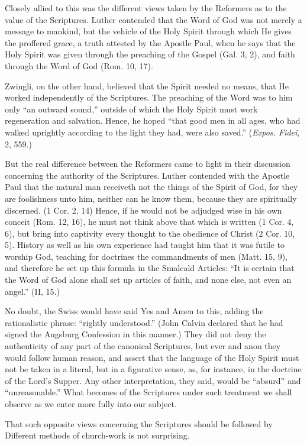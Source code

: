 \documentclass[
]{book}
\begin{document}
Closely allied to this was the different views taken by the Reformers as to the value of the Scriptures. Luther contended that the Word of God was not merely a message to mankind, but the vehicle of the Holy Spirit through which He gives the proffered grace, a truth attested by the Apostle Paul, when he says that the Holy Spirit was given through the preaching of the Gospel (Gal. 3, 2), and faith through the Word of God (Rom. 10, 17).

Zwingli, on the other hand, believed that the Spirit needed no means, that He worked independently of the Scriptures. The preaching of the Word was to him only ``an outward sound,'' outside of which the Holy Spirit must work regeneration and salvation. Hence, he hoped ``that good men in all ages, who had walked uprightly according to the light they had, were also saved.'' (\emph{Expos. Fidei}, 2, 559.)

But the real difference between the Reformers came to light in their discussion concerning the authority of the Scriptures. Luther contended with the Apostle Paul that the natural man receiveth not the things of the Spirit of God, for they are foolishness unto him, neither can he know them, because they are spiritually discerned. (1 Cor. 2, 14) Hence, if he would not be adjudged wise in his own conceit (Rom. 12, 16), he must not think above that which is written (1 Cor. 4, 6), but bring into captivity every thought to the obedience of Christ (2 Cor. 10, 5). History as well as his own experience had taught him that it was futile to worship God, teaching for doctrines the commandments of men (Matt. 15, 9), and therefore he set up this formula in the Smalcald Articles: ``It is certain that the Word of God alone shall set up articles of faith, and none else, not even an angel.'' (II, 15.)

No doubt, the Swiss would have said Yes and Amen to this, adding the rationalistic phrase: ``rightly understood.'' (John Calvin declared that he had signed the Augsburg Confession in this manner.) They did not deny the authenticity of any part of the canonical Scriptures, but ever and anon they would follow human reason, and assert that the language of the Holy Spirit must not be taken in a literal, but in a figurative sense, as, for instance, in the doctrine of the Lord's Supper. Any other interpretation, they said, would be ``absurd'' and ``unreasonable.'' What becomes of the Scriptures under such treatment we shall observe as we enter more fully into our subject.

That such opposite views concerning the Scriptures should be followed by Different methods of church-work is not surprising.
\end{document}
